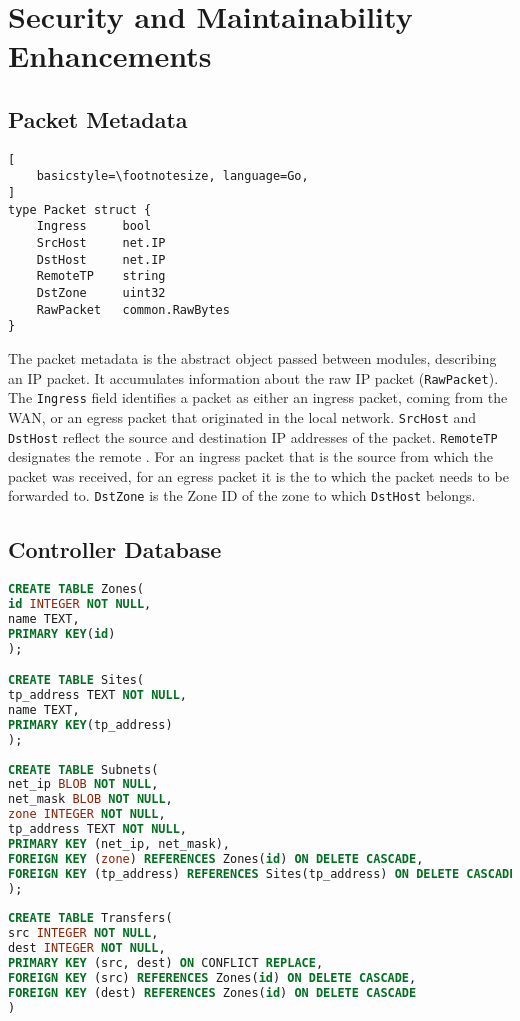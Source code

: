 \chapter{Security and Maintainability Enhancements}
\label{misc}

\section{Packet Metadata}
\label{apdx:metadata}

\begin{lstlisting}[
	basicstyle=\footnotesize, language=Go,
]
type Packet struct {
	Ingress		bool
	SrcHost 	net.IP
	DstHost 	net.IP
	RemoteTP	string
	DstZone		uint32
	RawPacket 	common.RawBytes
}
\end{lstlisting}

The packet metadata is the abstract object passed between modules, describing an IP packet. 
It accumulates information about the raw IP packet (\texttt{RawPacket}). The \texttt{Ingress} 
field identifies a packet as either an ingress packet, coming from the WAN, or an egress packet 
that originated in the local network. \texttt{SrcHost} and \texttt{DstHost} reflect the source 
and destination IP addresses of the packet. \texttt{RemoteTP} designates the remote \tp. For an 
ingress packet that is the source \tp from which the packet was received, for an egress packet 
it is the \tp to which the packet needs to be forwarded to. \texttt{DstZone} is the Zone ID of 
the zone to which \texttt{DstHost} belongs.

\section{Controller Database}
\label{apdx:controllerdb}


\begin{lstlisting}[language=sql, basicstyle=\tiny, %or \small or \footnotesize etc.
]
CREATE TABLE Zones(
id INTEGER NOT NULL,
name TEXT,
PRIMARY KEY(id)
);

CREATE TABLE Sites(
tp_address TEXT NOT NULL,
name TEXT,
PRIMARY KEY(tp_address)
);
	  
CREATE TABLE Subnets(
net_ip BLOB NOT NULL,
net_mask BLOB NOT NULL,
zone INTEGER NOT NULL,
tp_address TEXT NOT NULL,
PRIMARY KEY (net_ip, net_mask),
FOREIGN KEY (zone) REFERENCES Zones(id) ON DELETE CASCADE,
FOREIGN KEY (tp_address) REFERENCES Sites(tp_address) ON DELETE CASCADE
);
	  
CREATE TABLE Transfers(
src INTEGER NOT NULL,
dest INTEGER NOT NULL,
PRIMARY KEY (src, dest) ON CONFLICT REPLACE,
FOREIGN KEY (src) REFERENCES Zones(id) ON DELETE CASCADE,
FOREIGN KEY (dest) REFERENCES Zones(id) ON DELETE CASCADE	
)
\end{lstlisting}

